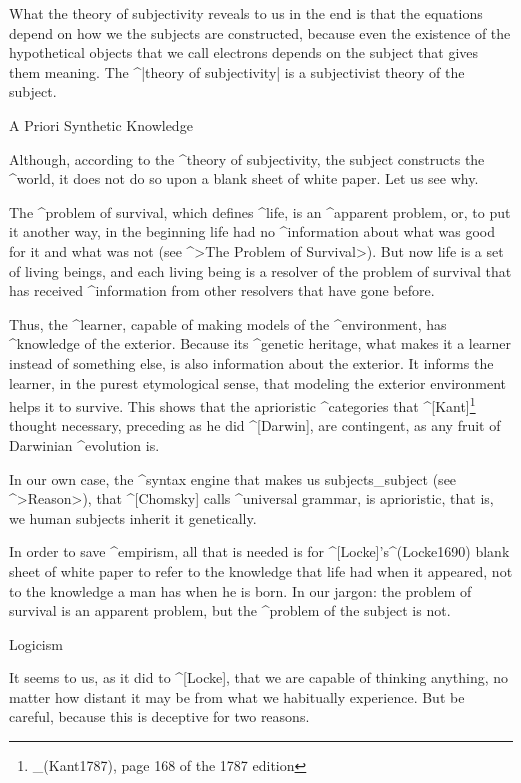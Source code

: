 What the theory of subjectivity reveals to us in the end is that the
equations depend on how we the subjects are constructed, because even
the existence of the hypothetical objects that we call electrons depends
on the subject that gives them meaning. The ^|theory of subjectivity| is
a subjectivist theory of the subject.


\Section A Priori Synthetic Knowledge

Although, according to the ^{theory of subjectivity}, the subject
constructs the ^{world}, it does not do so upon a blank sheet of white
paper. Let us see why.

The ^{problem of survival}, which defines ^{life}, is an ^{apparent
problem}, or, to put it another way, in the beginning life had no
^{information} about what was good for it and what was not (see ^>The
Problem of Survival>). But now life is a set of living beings, and each
living being is a resolver of the problem of survival that has received
^{information} from other resolvers that have gone before.

Thus, the ^{learner}, capable of making models of the ^{environment},
has  ^{knowledge} of the exterior. Because its
^{genetic} heritage, what makes it a learner instead of something else,
is also information about the exterior. It informs the learner, in the
purest etymological sense, that modeling the exterior environment helps
it to survive. This shows that the aprioristic ^{categories} that
^[Kant]\footnote{_(Kant1787), page 168 of the 1787 edition} thought
necessary, preceding as he did ^[Darwin], are contingent, as any fruit
of Darwinian ^{evolution} is.

In our own case, the ^{syntax engine} that makes us subjects_{subject}
(see ^>Reason>), that ^[Chomsky] calls ^{universal grammar}, is
aprioristic, that is, we human subjects inherit it genetically.

In order to save ^{empirism}, all that is needed is for
^[Locke]'s^(Locke1690) blank sheet of white paper to refer to the
knowledge that life had when it appeared, not to the knowledge a man has
when he is born. In our jargon: the problem of survival is an apparent
problem, but the ^{problem of the subject} is not.


\Section Logicism

It seems to us, as it did to ^[Locke], that we are capable of thinking
anything, no matter how distant it may be from what we habitually
experience. But be careful, because this is deceptive for two reasons.

